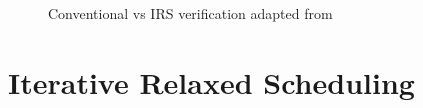 \begin{figure}[h]
     \caption{Conventional vs IRS verification adapted from \citet{metzler2017quick}}
\end{figure}


\section{Iterative Relaxed Scheduling \label{iter_rel_sched}}

